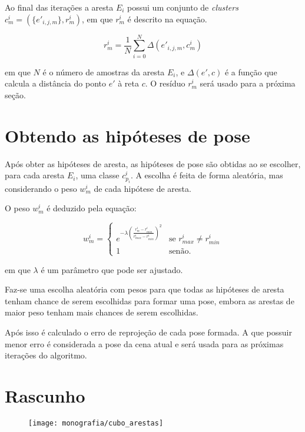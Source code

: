 Ao final das iterações a aresta $E_i$ possui um conjunto de \emph{clusters} $c^i_m = (\{e'_{i,j,m}\}, r^i_m)$, em que $r^i_m$ é descrito na equação.

\begin{equation}
r^i_m = \frac{1}{N} \sum^{N}_{i = 0} \Delta (e'_{i,j,m}, c^i_m)
\end{equation}

em que $N$ é o número de amostras da aresta $E_i$, e $\Delta (e', c)$ é a função que calcula a distância do ponto $e'$ à reta $c$. O resíduo $r^i_m$ será usado para a próxima seção.

\section{Obtendo as hipóteses de pose}

Após obter as hipóteses de aresta, as hipóteses de pose são obtidas ao se escolher, para cada aresta $E_i$, uma classe $c^i_{p_i}$. A escolha é feita de forma aleatória, mas considerando o peso $w^i_m$ de cada hipótese de aresta.

O peso $w^i_m$ é deduzido pela equação:

\begin{equation}
w^i_m = \begin{cases}
    e^{-\lambda \left( \frac{r^i_m - r^i_{min}}{r^i_{max} - r^i_{min}}\right)^2 } & \mbox{se } r^i_{max} \neq r^i_{min} \\
    1 & \mbox{senão}.
\end{cases}
\end{equation}

em que $\lambda$ é um parâmetro que pode ser ajustado.

Faz-se uma escolha aleatória com pesos para que todas as hipóteses de aresta tenham chance de serem escolhidas para formar uma pose, embora as arestas de maior peso tenham mais chances de serem escolhidas.

Após isso é calculado o erro de reprojeção de cada pose formada. A que possuir menor erro é considerada a pose da cena atual e será usada para as próximas iterações do algoritmo.

\section{Rascunho}

\begin{figure}[ht!]
\centering
\texttt{[image: monografia/cubo\_arestas]}
\caption{}
\label{cubo_arestas}
\end{figure}

